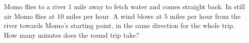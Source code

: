 Momo flies to a river $1$ mile away to fetch water and comes straight back. In still air Momo flies at $10$ miles per hour. A wind blows at $5$ miles per hour from the river towards Momo's starting point, in the same direction for the whole trip. How many minutes does the round trip take?
